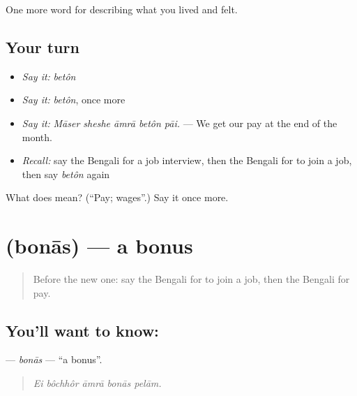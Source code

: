 \begin{grammarlens}[title={What you've built}]
One more word for describing what you lived and felt.
\end{grammarlens}

\subsection*{Your turn}
\begin{itemize}
\raggedright
  \item \emph{Say it:} \emph{betôn}
  \item \emph{Say it:} \emph{betôn}, once more
  \item \emph{Say it:} \emph{Māser sheshe āmrā betôn pāi.} — We get our pay at the end of the month.
  \item \emph{Recall:} say the Bengali for a job interview, then the Bengali for to join a job, then say \emph{betôn} again
\end{itemize}

\begin{tcolorbox}[breakable,colback=teal!4,colframe=teal!35!black,title={Before you move on}]
What does  mean? (\textquotedblleft{}Pay; wages\textquotedblright{}.) Say it once more.
\end{tcolorbox}
\section[\texorpdfstring{\bn{বোনাস} (bonās)}{বোনাস (bonās)}]{ (bonās) — a bonus}

\label{lesson:BN-C495-bonas}



\begin{quote}
Before the new one: say the Bengali for to join a job, then the Bengali for pay.
\end{quote}

\subsection*{You'll want to know: }
\textbf{} — \emph{bonās} — \textquotedblleft{}a bonus\textquotedblright{}.

\begin{quote}
    
\end{quote}

\begin{quote}
\emph{Ei bôchhôr āmrā bonās pelām.}
\end{quote}

